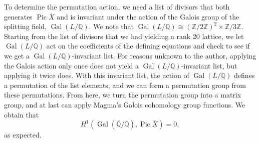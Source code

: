 \documentclass[12pt,twoside]{reedthesis}
\theoremstyle{plain}
\theoremstyle{definition}
\theoremstyle{remark}
\newcommand{\ZZ}{\mathbb{Z}}
\newcommand{\QQ}{\mathbb{Q}}
\newcommand{\Pic}{\operatorname{Pic}}
\newcommand{\Gal}{\operatorname{Gal}}
\begin{document}
To determine the permutation action, we need a list of divisors that both generates $\Pic\overline{X}$ and is invariant under the action of the Galois group of the splitting field, $\Gal(L/\QQ)$. We note that $\Gal(L/\QQ)\cong(\ZZ/2\ZZ)^2\times \ZZ/3\ZZ$. Starting from the list of divisors that we had yielding a rank 20 lattice, we let $\Gal(L/\QQ)$ act on the coefficients of the defining equations and check to see if we get a $\Gal(L/\QQ)$-invariant list. For reasons unknown to the author, applying the Galois action only once does not yield a $\Gal(L/\QQ)$-invariant list, but applying it twice does. With this invariant list, the action of $\Gal(L/\QQ)$ defines a permutation of the list elements, and we can form a permutation group from these permutations. From here, we turn the permutation group into a matrix group, and at last can apply Magma's Galois cohomology group functions. We obtain that
\[
H^1(\Gal(\overline{\QQ}/\QQ),\Pic\overline{X})=0,
\]
as expected.
\end{document}

